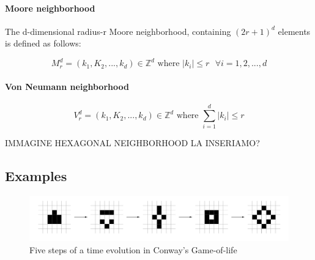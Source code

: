 \paragraph{Moore neighborhood}

The d-dimensional radius-r Moore neighborhood, containing $(2r +1)^d$ elements is defined as follows:

$$M_r^d = (k_1, K_2,...,k_d) \in \mathds{Z}^d \text{ where } |k_i| \leq r \text{  } \forall i = 1,2,...,d $$ 

\paragraph{Von Neumann neighborhood}


$$V_r^d = (k_1, K_2,...,k_d) \in \mathds{Z}^d \text{ where } \sum_{i=1}^{d} |k_i| \leq r$$

\par
IMMAGINE HEXAGONAL NEIGHBORHOOD LA INSERIAMO?


\subsection{Examples}

\begin{figure}
  \centering
    \includegraphics[width=1\textwidth]{gameoflife_example}%
    
  \caption{Five steps of a time evolution in Conway's Game-of-life\cite{canotes}}
  \label{fig:gameoflife}
\end{figure}


